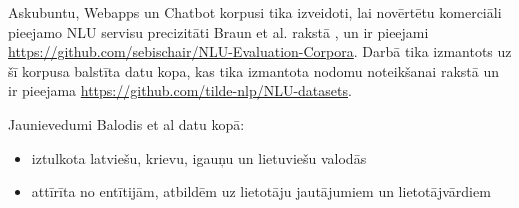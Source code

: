 Askubuntu, Webapps un Chatbot korpusi tika izveidoti, lai novērtētu komerciāli pieejamo NLU servisu precizitāti Braun et al. rakstā \cite{braun-2017}, un ir pieejami \url{https://github.com/sebischair/NLU-Evaluation-Corpora}. Darbā tika izmantots uz šī korpusa balstīta datu kopa, kas tika izmantota nodomu noteikšanai \cite{fasttext2019} rakstā un ir pieejama \url{https://github.com/tilde-nlp/NLU-datasets}.

Jaunievedumi Balodis et al datu kopā:
\begin{itemize}
    \item iztulkota latviešu, krievu, igauņu un lietuviešu valodās
    \item attīrīta no entītijām, atbildēm uz lietotāju jautājumiem un lietotājvārdiem
\end{itemize}